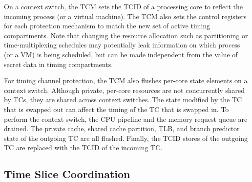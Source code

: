 On a context switch, the TCM sets the TCID of a processing core to reflect
the incoming process (or a virtual machine). The TCM also sets the control
registers for each protection mechanism to match the new set of active
timing compartments. Note that changing the resource allocation such as
partitioning or time-multiplexing schedules may potentially leak information on 
which process (or a VM) is being scheduled, but can be made independent
from the value of secret data in timing compartments.

For timing channel protection, the TCM also flushes per-core state elements
on a context switch.
Although private, per-core resources are not concurrently shared by TCs, they 
are shared across context switches. The state modified by the TC that is 
swapped out can affect the timing of the TC that is swapped in.
To perform the context switch, the CPU pipeline and the memory request queue 
are drained. 
The private cache, shared cache 
partition, TLB, and branch predictor state of the outgoing TC are all flushed.  
Finally, the TCID stores of the outgoing TC are replaced with the TCID of the 
incoming TC. 


\subsection{Time Slice Coordination}
\label{sec:coordination}

